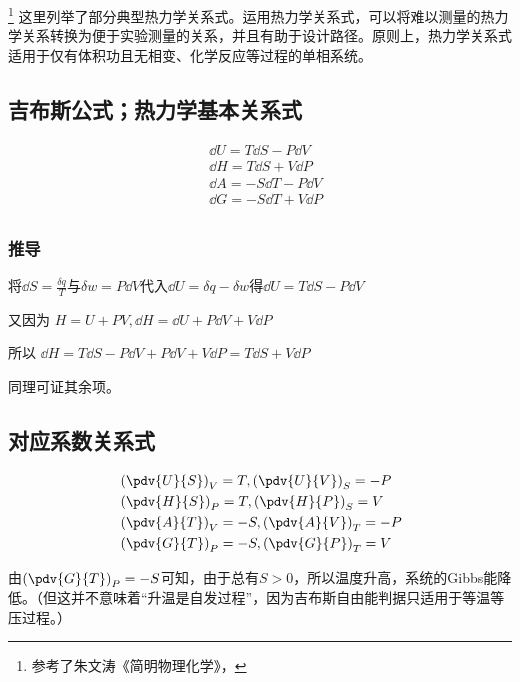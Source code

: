 
\footnote{参考了朱文涛《简明物理化学》，}
这里列举了部分典型热力学关系式。运用热力学关系式，可以将难以测量的热力学关系转换为便于实验测量的关系，并且有助于设计路径。原则上，热力学关系式适用于仅有体积功且无相变、化学反应等过程的单相系统。

\subsection{吉布斯公式；热力学基本关系式}
\begin{align}\label{eq_MWRel_4}
&\dd U = T \dd S - P \dd V\\
&\dd H = T \dd S + V \dd P\\
&\dd A = -S \dd T - P \dd V\\
&\dd G = -S \dd T +V \dd P\\
\end{align}

\subsubsection{推导}
将$\dd S = \frac{\delta q}{T}$与$\delta w = P\dd V$代入$\dd U=\delta q-\delta w$得$\dd U = T \dd S - P \dd V$

又因为 $H=U+PV, \dd H = \dd U + P \dd V + V \dd P$

所以 $\dd H = T \dd S - P \dd V+ P \dd V + V \dd P = T \dd S + V \dd P$

同理可证其余项。

\subsection{对应系数关系式}
\begin{align}
&\left(\pdv{U}{S}\right)_V=T, \left(\pdv{U}{V}\right)_S=-P
\\
&\left(\pdv{H}{S}\right)_P=T, \left(\pdv{H}{P}\right)_S=V
\\
&\left(\pdv{A}{T}\right)_V=-S, \left(\pdv{A}{V}\right)_T=-P
\\
&\left(\pdv{G}{T}\right)_P=-S, \left(\pdv{G}{P}\right)_T=V
\end{align}

由$\left(\pdv{G}{T}\right)_P=-S$可知，由于总有$S>0$，所以温度升高，系统的Gibbs能降低。（但这并不意味着“升温是自发过程”，因为吉布斯自由能判据只适用于等温等压过程。）

